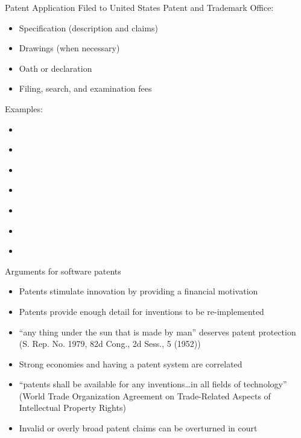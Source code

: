 \documentclass{beamer}
\begin{document}
\begin{frame}{Patent Application}
Filed to United States Patent and Trademark Office:
\begin{itemize}
\item Specification (description and claims)
\item Drawings (when necessary)
\item Oath or declaration
\item Filing, search, and examination fees
\end{itemize}
\bigskip
Examples:
\begin{itemize}
\item \href{http://www.google.com/patents/US5946647}{}
\item \href{http://www.google.com/patents/US7028023}{}
\item \href{http://www.google.com/patents/USD504889}{}
\item \href{https://www.google.com/patents/USD670713}{}
\item \href{https://www.google.com/patents/USD604305}{}
\item \href{https://www.google.com/patents/US7222078}{}
\item \href{http://www.google.com/patents/US5960411}{}
\end{itemize}
\end{frame}

\begin{frame}{Arguments for software patents}
\begin{itemize}
\item Patents stimulate innovation by providing a financial motivation
\item Patents provide enough detail for inventions to be re-implemented
\item ``any thing under the sun that is made by man'' deserves patent protection (S. Rep. No. 1979, 82d Cong., 2d Sess., 5 (1952))
\item Strong economies and having a patent system are correlated
\item ``patents shall be available for any inventions\ldots in all fields of technology'' (World Trade Organization Agreement on Trade-Related Aspects of Intellectual Property Rights)
\item Invalid or overly broad patent claims can be overturned in court
\end{itemize}
\end{frame}
\end{document}
